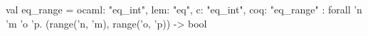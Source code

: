 val eq_range = {ocaml: "eq_int", lem: "eq", c: "eq_int", coq: "eq_range"} : forall 'n 'm 'o 'p. (range('n, 'm), range('o, 'p)) -> bool
